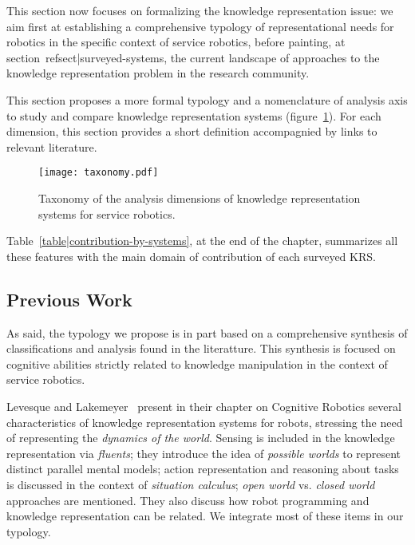 This section now focuses on formalizing the knowledge representation issue: we
aim first at establishing a comprehensive typology of representational needs
for robotics in the specific context of service robotics, before painting, at
section~ref{sect|surveyed-systems}, the current landscape of approaches to the
knowledge representation problem in the research community.

This section proposes a more formal typology and a nomenclature of analysis
axis to study and compare knowledge representation systems
(figure~\ref{fig|taxo}). For each dimension, this section provides a short
definition accompagnied by links to relevant literature.

\begin{figure}
        \centering
        \texttt{[image: taxonomy.pdf]}
        \caption{Taxonomy of the analysis dimensions of knowledge
        representation systems for service robotics.}
        \label{fig|taxo}
\end{figure}

Table~\ref{table|contribution-by-systems}, at the end of the chapter,
summarizes all these features with the main domain of contribution of each
surveyed KRS.


\subsection{Previous Work}
\label{sect|evaluation-literature}

As said, the typology we propose is in part based on a comprehensive synthesis of
classifications and analysis found in the literatture. This synthesis is focused
on cognitive abilities strictly related to knowledge manipulation in the
context of service robotics.

Levesque and Lakemeyer~\cite{Levesque2008} present in their chapter on Cognitive
Robotics several characteristics of knowledge representation systems for
robots, stressing the need of representing the \emph{dynamics of the world}.  Sensing
is included in the knowledge representation via \emph{fluents}; they introduce the
idea of \emph{possible worlds} to represent distinct parallel mental models;
action representation and reasoning about tasks is discussed in the context of
\emph{situation calculus}; \emph{open world} vs. \emph{closed world} approaches are mentioned.
They also discuss how robot programming and knowledge representation can be
related. We integrate most of these items in our typology.

